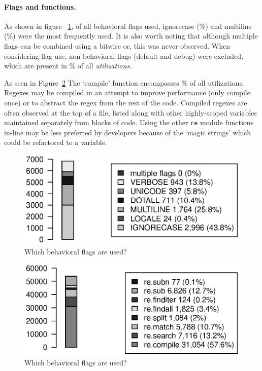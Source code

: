 

\paragraph{Flags and functions.}
\label{sec:flagsAndFunctions} As shown in figure ~\ref{fig:partFlags}, of all behavioral flags used, ignorecase (\%) and multiline (\%) were the most frequently used.  It is also worth noting that although multiple flags can be combined using a bitwise or, this was never observed.
When considering flag use, non-behavioral flags (default and debug) were excluded, which are present in \% of all \emph{utilizations}.

As seen in Figure~\ref{fig:partFunctions} The `compile' function encompasses \% of all utilizations.  Regexes may be compiled in an attempt to improve performance (only compile once) or to abstract the regex from the rest of the code.  Compiled regexes are often observed at the top of a file, listed along with other highly-scoped variables maintained separately from blocks of code.  Using the other {\tt re} module functions in-line may be less preferred by developers because of the `magic strings' which could be refactored to a variable.

\begin{figure}[ht]
\centering
  \centering
  \includegraphics[width=.72\textwidth]{nontex/illustrations/partFlags.eps}
  \caption{Which behavioral flags are used?}
  \vspace{-6pt}
\label{fig:partFlags}
\end{figure}

\begin{figure}[ht]
\centering
  \centering
  \includegraphics[width=.70\textwidth]{nontex/illustrations/partFunctions.eps}
  \caption{Which behavioral flags are used?}
  \vspace{-6pt}
\label{fig:partFunctions}
\end{figure}
